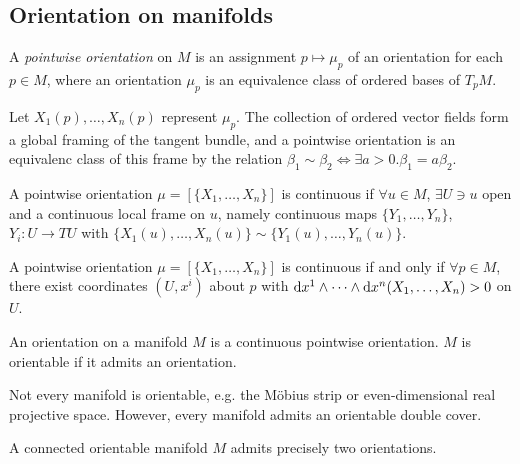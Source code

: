 \subsection{Orientation on manifolds}
\begin{defn}
A \emph{pointwise orientation} on $M$ is an assignment
$p \mapsto \mu_p$ of an orientation for each $p \in M$, where an
orientation $\mu_p$ is an equivalence class of ordered bases of
$T_p M$.
\end{defn}

Let $X_1(p), \dots, X_n(p)$ represent $\mu_p$. The collection of
ordered vector fields form a global framing of the tangent bundle, and
a pointwise orientation is an equivalenc class of this frame by the
relation
$\beta_1 \sim \beta_2 \iff \exists a > 0 . \beta_1 = a \beta_2$.

\begin{defn}
A pointwise orientation $\mu = [\{ X_1, \dots, X_n \}]$ is continuous
if $\forall u \in M$, $\exists U \ni u$ open and a continuous local
frame on $u$, namely continuous maps $\{Y_1, \dots, Y_n\}$,
$Y_i : U \to T U$  with
$\{X_1(u), \dots, X_n(u)\} \sim \{Y_1(u), \dots, Y_n(u)\}$.
\end{defn}

A pointwise orientation $\mu = [\{X_1, \dots, X_n\}]$ is
continuous if and only if $\forall p \in M$, there exist coordinates
$(U, x^i)$ about $p$ with
$\mathop{}\!\mathrm{d} x^1 \wedge \cdots \wedge \mathop{}\!\mathrm{d} x^n (X_1, \dots, X_n) > 0$ on $U$.

\begin{defn}
An orientation on a manifold $M$ is a continuous pointwise
orientation. $M$ is orientable if it admits an orientation.
\end{defn}

Not every manifold is orientable, e.g. the M\"{o}bius strip or
even-dimensional real projective space. However, every manifold admits
an orientable double cover.

\begin{prop}
A connected orientable manifold $M$ admits precisely two
orientations.
\end{prop}

